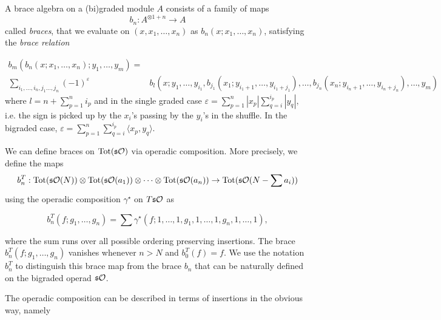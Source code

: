 \documentclass[twoside]{article}
\begin{document}
\begin{defin}\label{braces}
A brace algebra on a (bi)graded module $A$ consists of a family of maps \[b_n:A^{\otimes 1+n}\to A\] called \emph{braces}, that we evaluate on $(x,x_1,\dots, x_n)$ as $b_n(x;x_1,\dots, x_n)$, satisfying the \emph{brace relation}


\begin{align*}
b_m(b_n(x;x_1,\dots, x_n);y_1,\dots,y_m)=&\\
\sum_{i_1,\dots, i_n, j_1\dots, j_n}(-1)^{\varepsilon}&b_l(x; y_1,\dots, y_{i_1},b_{j_1}(x_1;y_{i_1+1},\dots, y_{i_1+j_1}),\dots, b_{j_n}(x_n;y_{i_n+1},\dots, y_{i_n+j_n}),\dots,y_m)
\end{align*}
where $l=n+\sum_{p=1}^n i_p$ and in the single graded case $\varepsilon=\sum_{p=1}^n|x_p|\sum_{q=i}^{i_p}|y_q|,$ i.e. the sign is picked up by the $x_i$'s passing by the $y_i$'s in the shuffle. In the bigraded case, $\varepsilon=\sum_{p=1}^n\sum_{q=i}^{i_p}\langle x_p,y_q\rangle$.



\end{defin}


We can define braces on $\mathrm{Tot}(\mathfrak{s}{\mathcal O})$ via operadic composition. More precisely, we define the maps 
\[b^T_n:\mathrm{Tot}(\mathfrak{s}{\mathcal O}(N))\otimes \mathrm{Tot}(\mathfrak{s}{\mathcal O}(a_1))\otimes\cdots\otimes \mathrm{Tot}(\mathfrak{s}{\mathcal O}(a_n))\to \mathrm{Tot}(\mathfrak{s}{\mathcal O}(N-\sum a_i))\]
using the operadic composition $\gamma^\star$ on $T\mathfrak{s}{\mathcal O}$ as

\[b^T_n(f;g_1,\dots,g_n)=\sum\gamma^\star(f;1,\dots,1,g_1,1,\dots,1,g_n,1,\dots,1),\]

where the sum runs over all possible ordering preserving insertions. The brace $b^T_n(f;g_1,\dots,g_n)$ vanishes whenever $n>N$ and $b^T_0(f)=f$. We use the notation $b^T_n$ to distinguish this brace map from the brace $b_n$ that can be naturally defined on the bigraded operad $\mathfrak{s}{\mathcal O}$.

The operadic composition can be described in terms of insertions in the obvious way, namely 
\end{document}
